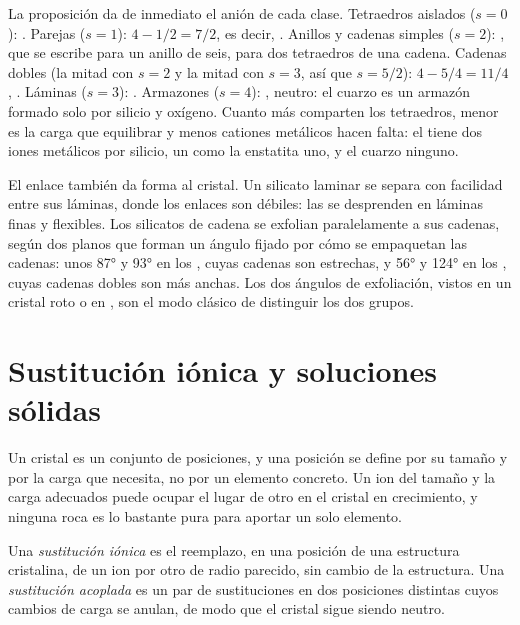 La proposición da de inmediato el anión de cada clase. Tetraedros aislados ($s = 0$): . Parejas
($s = 1$): $4 - 1/2 = 7/2$, es decir, . Anillos y cadenas simples ($s = 2$): , que
se escribe  para un anillo de seis,  para dos tetraedros de una cadena. Cadenas
dobles (la mitad con $s = 2$ y la mitad con $s = 3$, así que $s = 5/2$): $4 - 5/4 = 11/4$, .
Láminas ($s = 3$): . Armazones ($s = 4$): , neutro: el cuarzo es un armazón formado solo
por silicio y oxígeno. Cuanto más comparten los tetraedros, menor es la carga que equilibrar y menos cationes
metálicos hacen falta: el   tiene dos iones metálicos por silicio, un  como la
enstatita  uno, y el cuarzo ninguno.

El enlace también da forma al cristal. Un silicato laminar se separa con facilidad entre sus láminas, donde
los enlaces son débiles: las  se desprenden en láminas finas y flexibles. Los silicatos de cadena se
exfolian paralelamente a sus cadenas, según dos planos que forman un ángulo fijado por cómo se empaquetan
las cadenas: unos \ang{87} y \ang{93} en los , cuyas cadenas son estrechas, y \ang{56} y \ang{124} en
los , cuyas cadenas dobles son más anchas. Los dos ángulos de exfoliación, vistos en un cristal
roto o en , son el modo clásico de distinguir los dos grupos.

\section{Sustitución iónica y soluciones sólidas}

Un cristal es un conjunto de posiciones, y una posición se define por su tamaño y por la carga que necesita,
no por un elemento concreto. Un ion del tamaño y la carga adecuados puede ocupar el lugar de otro en el cristal
en crecimiento, y ninguna roca es lo bastante pura para aportar un solo elemento.

\begin{definition}\label{def:b1:rock-forming-minerals:substitution}
Una \emph{sustitución iónica} es el reemplazo, en una posición de una estructura
cristalina, de un ion por otro de radio parecido, sin cambio de la estructura. Una \emph{sustitución
acoplada} es un par de sustituciones en dos posiciones distintas cuyos cambios
de carga se anulan, de modo que el cristal sigue siendo neutro.
\end{definition}

